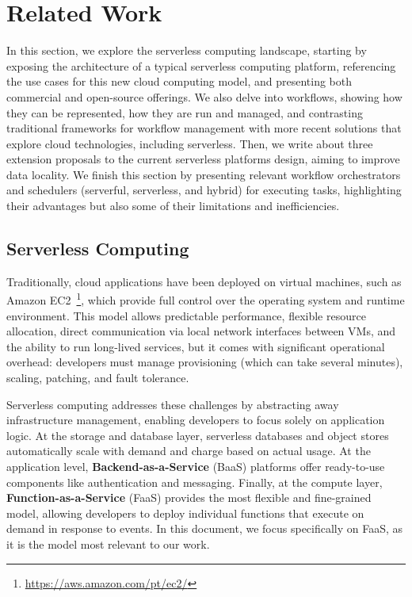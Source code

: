 \chapter{Related Work}
\label{chap:rw}
\chaptoc
\bigskip

In this section, we explore the serverless computing landscape, starting by exposing the architecture of a typical serverless computing platform, referencing the use cases for this new cloud computing model, and presenting both commercial and open-source offerings. We also delve into workflows, showing how they can be represented, how they are run and managed, and contrasting traditional frameworks for workflow management with more recent solutions that explore cloud technologies, including serverless. Then, we write about three extension proposals to the current serverless platforms design, aiming to improve data locality. We finish this section by presenting relevant workflow orchestrators and schedulers (serverful, serverless, and hybrid) for executing tasks, highlighting their advantages but also some of their limitations and inefficiencies.

\section{Serverless Computing}

Traditionally, cloud applications have been deployed on virtual machines, such as Amazon EC2~\footnote{\url{https://aws.amazon.com/pt/ec2/}}, which provide full control over the operating system and runtime environment. This model allows predictable performance, flexible resource allocation, direct communication via local network interfaces between VMs, and the ability to run long-lived services, but it comes with significant operational overhead: developers must manage provisioning (which can take several minutes), scaling, patching, and fault tolerance. 

Serverless computing addresses these challenges by abstracting away infrastructure management, enabling developers to focus solely on application logic. At the storage and database layer, serverless databases and object stores automatically scale with demand and charge based on actual usage. At the application level, \textbf{Backend-as-a-Service} (BaaS) platforms offer ready-to-use components like authentication and messaging. Finally, at the compute layer, \textbf{Function-as-a-Service} (FaaS) provides the most flexible and fine-grained model, allowing developers to deploy individual functions that execute on demand in response to events. In this document, we focus specifically on FaaS, as it is the model most relevant to our work.

